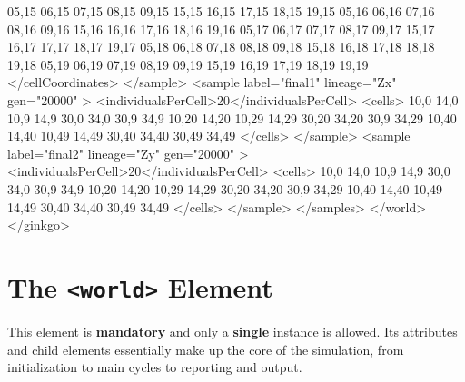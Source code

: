 \documentclass[11pt]{article}
\newcommand{\xmlelem}[1]{{\tt<\textcolor{xmlelem}{#1}>}}
\begin{document}
\begin{ginkgoxml}
                    05,15 06,15 07,15 08,15 09,15    15,15 16,15 17,15 18,15 19,15
                    05,16 06,16 07,16 08,16 09,16    15,16 16,16 17,16 18,16 19,16
                    05,17 06,17 07,17 08,17 09,17    15,17 16,17 17,17 18,17 19,17
                    05,18 06,18 07,18 08,18 09,18    15,18 16,18 17,18 18,18 19,18
                    05,19 06,19 07,19 08,19 09,19    15,19 16,19 17,19 18,19 19,19
                </cellCoordinates>
            </sample>
            <sample label="final1" lineage="Zx" gen="20000" >
                <individualsPerCell>20</individualsPerCell>
                <cells>
                    10,0  14,0   10,9   14,9     30,0  34,0  30,9  34,9
                    10,20 14,20  10,29  14,29    30,20 34,20 30,9  34,29
                    10,40 14,40  10,49  14,49    30,40 34,40 30,49 34,49
                </cells>
            </sample>
            <sample label="final2" lineage="Zy" gen="20000" >
                <individualsPerCell>20</individualsPerCell>
                <cells>
                    10,0  14,0   10,9   14,9     30,0  34,0  30,9  34,9
                    10,20 14,20  10,29  14,29    30,20 34,20 30,9  34,29
                    10,40 14,40  10,49  14,49    30,40 34,40 30,49 34,49
                </cells>
            </sample>
        </samples>
    </world>
</ginkgo>
\end{ginkgoxml}



\section{The \xmlelem{world} Element}

This element is \textbf{mandatory} and only a \textbf{single} instance is allowed.
Its attributes and child elements essentially make up the core of the simulation, from initialization to main cycles to reporting and output.
\end{document}
